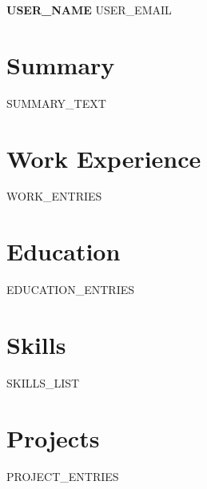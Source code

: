 \documentclass[11pt,a4paper]{article}
\begin{document}
\begin{center}
{\LARGE\bfseries {{USER_NAME}}}
\vspace{0.3em}
{\small {{USER_EMAIL}} }
\end{center}

\vspace{1em}

\section*{Summary}
{{SUMMARY_TEXT}}

\vspace{1em}

\section*{Work Experience}
{{WORK_ENTRIES}}

\vspace{1em}

\section*{Education}
{{EDUCATION_ENTRIES}}

\vspace{1em}

\section*{Skills}
{{SKILLS_LIST}}

\vspace{1em}

\section*{Projects}
{{PROJECT_ENTRIES}}
\end{document}
